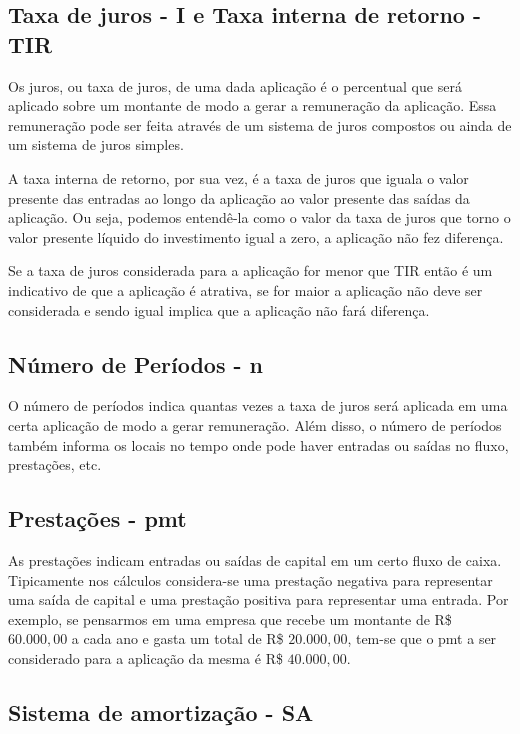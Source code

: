 \subsection{Taxa de juros - I e Taxa interna de retorno - TIR}

Os juros, ou taxa de juros, de uma dada aplicação é o percentual que será aplicado sobre um montante de modo a gerar a remuneração da aplicação. Essa remuneração pode ser feita através de um sistema de juros compostos ou ainda de um sistema de juros simples.

A taxa interna de retorno, por sua vez, é a taxa de juros que iguala o valor presente das entradas ao longo da aplicação ao valor presente das saídas da aplicação. Ou seja, podemos entendê-la como o valor da taxa de juros que torno o valor presente líquido do investimento igual a zero, a aplicação não fez diferença.

Se a taxa de juros considerada para a aplicação for menor que TIR então é um indicativo de que a aplicação é atrativa, se for maior a aplicação não deve ser considerada e sendo igual implica que a aplicação não fará diferença. \cite{irr}

\subsection{Número de Períodos - n}

O número de períodos indica quantas vezes a taxa de juros será aplicada em uma certa aplicação de modo a gerar remuneração. Além disso, o número de períodos também informa os locais no tempo onde pode haver entradas ou saídas no fluxo, prestações, etc.

\subsection{Prestações - pmt}

As prestações indicam entradas ou saídas de capital em um certo fluxo de caixa. Tipicamente nos cálculos considera-se uma prestação negativa para representar uma saída de capital e uma prestação positiva para representar uma entrada. Por exemplo, se pensarmos em uma empresa que recebe um montante de R\$ $60.000,00$ a cada ano e gasta um total de R\$ $20.000,00$, tem-se que o pmt a ser considerado para a aplicação da mesma é R\$ $40.000,00$.


\subsection{Sistema de amortização - SA}

